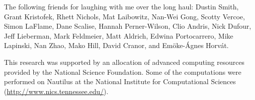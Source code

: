 \noindent
The following friends for laughing with me over the long haul:
Dustin Smith, %
Grant Kristofek, %
Rhett Nichols,
Mat Laibowitz, %
Nan-Wei Gong, %
Scotty Vercoe,
Simon LaFlame,
Dane Scalise,
Hannah Perner-Wilson, %
Clio Andris, %
Nick Dufour,
Jeff Lieberman, %
Mark Feldmeier, %
Matt Aldrich, %
Edwina Portocarrero, %
Mike Lapinski, %
Nan Zhao, %
Mako Hill, %
David Cranor, and %
Em\"{o}ke-\'{A}gnes Horv\'{a}t. %

\vspace{5mm}

\vspace{5mm}

\noindent
This research was supported by an allocation of advanced computing
resources provided by the National Science Foundation.  Some of the
computations were performed on Nautilus at the National Institute for
Computational Sciences (\url{http://www.nics.tennessee.edu/}).

\endgroup

